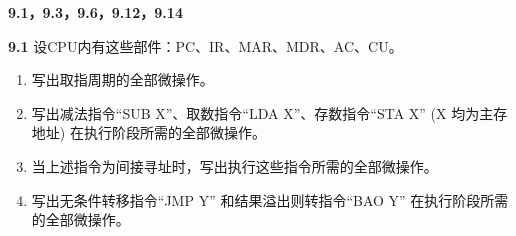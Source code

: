 \documentclass[UTF8]{report}
\newcommand{\problem}[1]{{\setlength{\parskip}{10pt}\noindent \bf{#1}}}
\begin{document}

\maketitle



\textbf{9.1，9.3，9.6，9.12，9.14}

\problem{9.1} 设CPU内有这些部件：PC、IR、MAR、MDR、AC、CU。
\begin{enumerate}[label=(\arabic*)]
    \item 写出取指周期的全部微操作。
    \item 写出减法指令``SUB X''、取数指令``LDA X''、存数指令``STA X'' (X 均为主存地址) 在执行阶段所需的全部微操作。
    \item 当上述指令为间接寻址时，写出执行这些指令所需的全部微操作。
    \item 写出无条件转移指令``JMP Y'' 和结果溢出则转指令``BAO Y'' 在执行阶段所需的全部微操作。
\end{enumerate}
\end{document}
